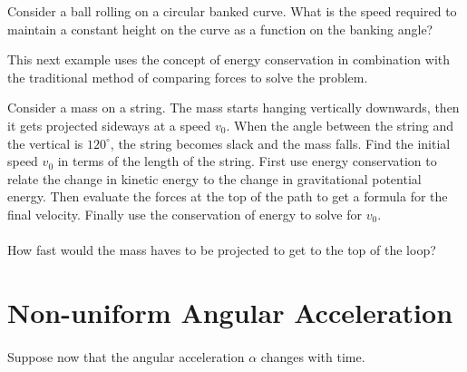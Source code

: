 \documentclass[../newtonian_mechanics.tex]{subfiles}
\begin{document}
        \begin{example}
            Consider a ball rolling on a circular banked curve.
            What is the speed required to maintain a constant height on the curve as a function on the banking angle?
        \end{example}
        This next example uses the concept of energy conservation in combination with the traditional method of comparing forces to solve the problem.
        \begin{example}
            Consider a mass on a string.
            The mass starts hanging vertically downwards, then it gets projected sideways at a speed $v_0$.
            When the angle between the string and the vertical is $120^\circ$, the string becomes slack and the mass falls.
            Find the initial speed $v_0$ in terms of the length of the string.
            First use energy conservation to relate the change in kinetic energy to the change in gravitational potential energy.
            Then evaluate the forces at the top of the path to get a formula for the final velocity.
            Finally use the conservation of energy to solve for $v_0$.

            \paragraph{}
            How fast would the mass haves to be projected to get to the top of the loop?
        \end{example}

    \section{Non-uniform Angular Acceleration}
        \paragraph{}
        Suppose now that the angular acceleration $\alpha$ changes with time.

\end{document}
